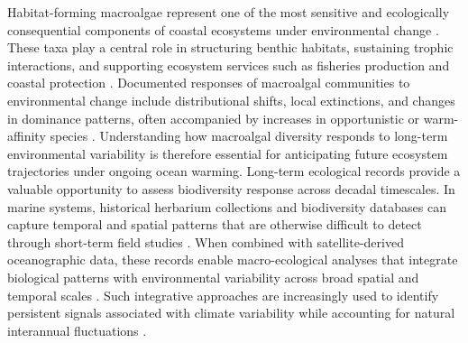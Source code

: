 \documentclass[a4paper,fleqn]{cas-sc}
\begin{document}
Habitat-forming macroalgae represent one of the most sensitive and ecologically consequential components of coastal ecosystems under environmental change \citep{Ji2021, Noissetteetal2022}. These taxa play a central role in structuring benthic habitats, sustaining trophic interactions, and supporting ecosystem services such as fisheries production and coastal protection \citep{RILOV2020105045, Nahor2024}. Documented responses of macroalgal communities to environmental change include distributional shifts, local extinctions, and changes in dominance patterns, often accompanied by increases in opportunistic or warm-affinity species \citep{SANGIL2012, Vergesetal2016, JI202191}. Understanding how macroalgal diversity responds to long-term environmental variability is therefore essential for anticipating future ecosystem trajectories under ongoing ocean warming. Long-term ecological records provide a valuable opportunity to assess biodiversity response across decadal timescales. In marine systems, historical herbarium collections and biodiversity databases can capture temporal and spatial patterns that are otherwise difficult to detect through short-term field studies \citep{Lang2019, Antao2020}. When combined with satellite-derived oceanographic data, these records enable macro-ecological analyses that integrate biological patterns with environmental variability across broad spatial and temporal scales \citep{Duffy2019Toward}. Such integrative approaches are increasingly used to identify persistent signals associated with climate variability while accounting for natural interannual fluctuations \citep{Mahmoud2025}.
\end{document}
